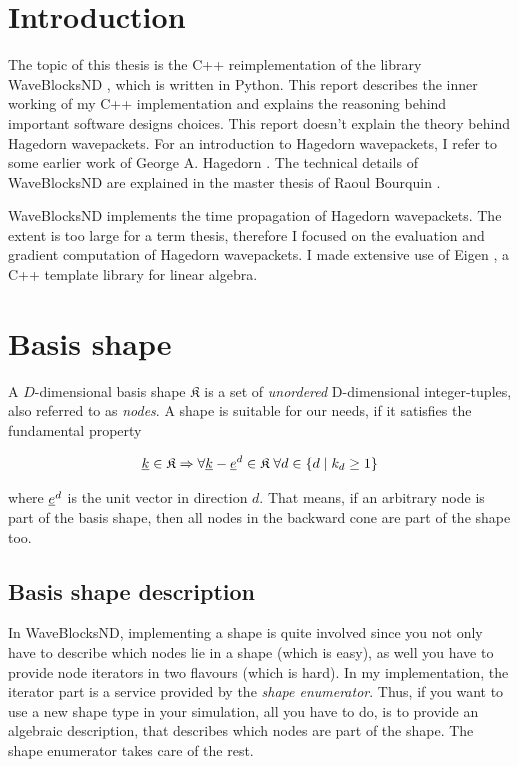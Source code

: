 \documentclass{article}
\begin{document}


\tableofcontents
\clearpage

\section{Introduction}
The topic of this thesis is the C++ reimplementation of the library WaveBlocksND
\cite{waveblocksnd}, which is written in Python.
This report describes the inner working of my C++ implementation
and explains the reasoning behind important software designs choices.
This report doesn't explain the theory behind Hagedorn wavepackets.
For an introduction to Hagedorn wavepackets, I refer to some earlier work
of George A. Hagedorn \cite{H_ladder_operators}.
The technical details of WaveBlocksND are explained
in the master thesis of Raoul Bourquin \cite{B_master_thesis}.

WaveBlocksND implements the time propagation of Hagedorn wavepackets.
The extent is too large for a term thesis, therefore I focused on the
evaluation and gradient computation of Hagedorn wavepackets.
I made extensive use of Eigen \cite{eigenweb}, a C++ template library for linear algebra.

\section{Basis shape}

A \(D\)-dimensional basis shape \(\mathfrak{K}\)
is a set of \emph{unordered} D-dimensional integer-tuples, also
referred to as \emph{nodes}.  A shape is suitable for our needs, if it
satisfies the fundamental property

\begin{equation}
  \label{eq:basis_shape_fundamental_property}
  \underline{k} \in \mathfrak{K} \Rightarrow \forall
  \underline{k}-\underline{e}^d \in \mathfrak{K} \;\forall d \in \{d \;|\;k_d \geq 1\}
\end{equation}

where \(\underline{e}^d\) is the unit vector in direction \(d\).
That means, if an arbitrary node is part of the basis shape, then all nodes
in the backward cone are part of the shape too.

\subsection{Basis shape description}
In WaveBlocksND, implementing a shape is quite involved since you
not only have to describe which nodes lie in a shape (which is easy),
as well you have to provide node iterators in two flavours (which is hard).
In my implementation, the iterator part is a service provided by the
\emph{shape enumerator}. Thus, if you want to use a new shape type in your simulation,
all you have to do, is to provide an algebraic description, that describes
which nodes are part of the shape. The shape enumerator takes care of the rest.
\end{document}
